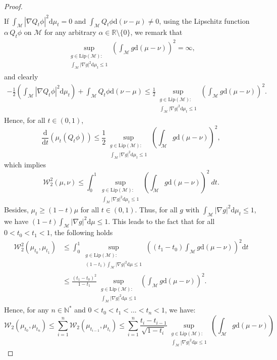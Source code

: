 \documentclass[10pt,a4paper]{article}
\newcommand\cM{\mathcal{M}}
\newcommand\cW{\mathcal{W}}
\newcommand\dR{\mathbb{R}}
\newcommand\dd{\mathrm{d}}
\newcommand{\PAR}[1]{{{\left(#1\right)}}} %
\begin{document}
\begin{proof}
\begin{align*}
    \end{align*}
    If $ \int_\cM  |\nabla Q_t \phi|^2\dd \mu_t =0$ and $\int_\cM Q_t\phi\dd(\nu-\mu)\neq 0$, using the Lipschitz function $\alpha\, Q_t\phi$ on $\cM$ for any arbitrary $\alpha\in\dR\setminus \{0\}$, we remark that 
    \begin{align*}
       \sup_{\substack{g \in \text{Lip}(\cM): \\ \int_\cM | \nabla g|^2 \dd \mu_t \le 1}} \PAR{ \int_\cM g\dd (\mu-\nu)}^2=\infty,
    \end{align*}
and clearly
    \begin{align*}
        -\frac{1}{2} \PAR{\int_\cM  |\nabla Q_t \phi|^2\dd \mu_t}+\int_\cM Q_t\phi\dd(\nu-\mu)
        \le  \frac{1}{2}\sup_{\substack{g \in \text{Lip}(\cM): \\ \int_\cM | \nabla g|^2 \dd \mu_t \le 1}} \PAR{ \int_\cM g\dd (\mu-\nu)}^2.
    \end{align*}
    Hence, for all $t \in (0,1)$,
    $$
        \frac{\dd }{\dd t} \PAR{ \mu_t(Q_t \phi )}  \le \frac{1}{2} \sup_{\substack{g \in \text{Lip}(\cM):                                                 \\ \int_\cM | \nabla g|^2 \dd \mu_t \le 1}} \PAR{ \int_\cM g\dd (\mu-\nu)}^2,
    $$
 which implies
    $$
        \cW_2^2(\mu,\nu)  \le \int_{0}^{1} \sup_{\substack{g \in \text{Lip}(\cM):                                                 \\ \int_\cM | \nabla g|^2 \dd \mu_t \le 1}} \PAR{ \int_\cM g\dd (\mu-\nu)}^2 \ dt.
    $$
    Besides, $\mu_t \ge (1-t)\mu$ for all $ t \in (0,1)$. Thus, for all $g$ with $\int_\cM | \nabla g|^2 \dd \mu_t \le 1$,  we have $(1-t)\int_\cM | \nabla g|^2 \dd \mu \le 1$.
    This leads to the fact that for all  $0<t_0<t_1<1$, the following holds
    \begin{align*}
        \cW_2^2(\mu_{t_0},\mu_{t_1}) & \le \int_{0}^{1} \sup_{\substack{g \in \text{Lip}(\cM):              \\ (1-t_1)\int_\cM | \nabla g|^2 \dd \mu \le 1}} \PAR{ (t_1-t_0)\int_\cM g\dd (\mu-\nu)}^2\dd t
        \\
                                     & \le  \frac{(t_1-t_0)^2}{1-t_1}\sup_{\substack{g \in \text{Lip}(\cM): \\ \int_\cM | \nabla g|^2 \dd \mu \le 1}} \PAR{ \int_\cM g\dd (\mu-\nu)}^2.
    \end{align*}
 Hence, for any $n \in \mathbb{N^*}$ and $0< t_0<t_1<...<t_n<1$, we have:
    $$
        \cW_2( \mu_{t_0},\mu_{t_n}) \le \sum_{i=1}^n \cW_2( \mu_{t_{i-1}},\mu_{t_i}) \le \sum_{i=1}^n \frac{t_{i}-t_{i-1}}{\sqrt{1-t_i}} \sup_{\substack{g \in \text{Lip}(\cM): \\ \int_\cM | \nabla g|^2 \dd \mu \le 1}} \PAR{ \int_\cM g\dd (\mu-\nu)}
$$
\end{proof}
\end{document}
